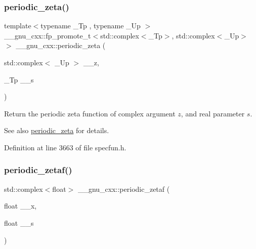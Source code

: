 \subsubsection{\texorpdfstring{periodic\+\_\+zeta()}{periodic\_zeta()}\hspace{0.1cm}{\footnotesize\ttfamily [2/2]}}
{\footnotesize\ttfamily template$<$typename \+\_\+\+Tp , typename \+\_\+\+Up $>$ \\
\+\_\+\+\_\+gnu\+\_\+cxx\+::fp\+\_\+promote\+\_\+t$<$std\+::complex$<$\+\_\+\+Tp$>$, std\+::complex$<$\+\_\+\+Up$>$ $>$ \+\_\+\+\_\+gnu\+\_\+cxx\+::periodic\+\_\+zeta (\begin{DoxyParamCaption}\item[{std\+::complex$<$ \+\_\+\+Up $>$}]{\+\_\+\+\_\+z,  }\item[{\+\_\+\+Tp}]{\+\_\+\+\_\+s }\end{DoxyParamCaption})\hspace{0.3cm}{\ttfamily [inline]}}

Return the periodic zeta function of complex argument $ z $, and real parameter $ s $.

\begin{DoxySeeAlso}{See also}
\hyperlink{group__gnu__math__spec__func_ga06b06216e87b868cb21c76d33ac560c8}{periodic\+\_\+zeta} for details. 
\end{DoxySeeAlso}


Definition at line 3663 of file specfun.\+h.

\mbox{\label{group__gnu__math__spec__func_ga1308c2a5d1b263757485cb48eb2c19ff}} 
\subsubsection{\texorpdfstring{periodic\+\_\+zetaf()}{periodic\_zetaf()}}
{\footnotesize\ttfamily std\+::complex$<$float$>$ \+\_\+\+\_\+gnu\+\_\+cxx\+::periodic\+\_\+zetaf (\begin{DoxyParamCaption}\item[{float}]{\+\_\+\+\_\+x,  }\item[{float}]{\+\_\+\+\_\+s }\end{DoxyParamCaption})\hspace{0.3cm}{\ttfamily [inline]}}

